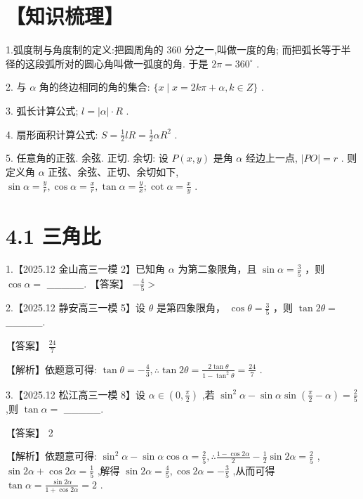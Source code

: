 \documentclass[10pt]{article}
\begin{document}
\section*{【知识梳理】}

1.弧度制与角度制的定义:把圆周角的 360 分之一,叫做一度的角; 而把弧长等于半径的这段弧所对的圆心角叫做一弧度的角. 于是 \({2\pi } = {360}^{ \circ  }\) .

2. 与 \(\alpha\) 角的终边相同的角的集合: \(\{ x \mid  x = {2k\pi } + \alpha ,k \in  Z\}\) .

3. 弧长计算公式; \(l = \left| \alpha \right|  \cdot  R\) .

4. 扇形面积计算公式: \(S = \frac{1}{2}{lR} = \frac{1}{2}\alpha {R}^{2}\) .

5. 任意角的正弦. 余弦. 正切. 余切: 设 \(P\left( {x,y}\right)\) 是角 \(\alpha\) 经边上一点, \(\left| {PO}\right|  = r\) . 则定义角 \(\alpha\) 正弦、余弦、正切、余切如下, \(\sin \alpha  = \frac{y}{r},\cos \alpha  = \frac{x}{r},\tan \alpha  = \frac{y}{x};\cot \alpha  = \frac{x}{y}\) .

\section*{4.1 三角比}

1.【2025.12 金山高三一模 2】已知角 \(\alpha\) 为第二象限角，且 \(\sin \alpha  = \frac{3}{5}\) ，则 \(\cos \alpha  =\) \_\_\_\_\_. 【答案】 \(- \frac{4}{5} >\)

2.【2025.12 静安高三一模 5】设 \(\theta\) 是第四象限角， \(\cos \theta  = \frac{3}{5}\) ，则 \(\tan {2\theta } =\) \_\_\_\_\_.

【答案】 \(\frac{24}{7}\)

【解析】依题意可得: \(\tan \theta  =  - \frac{4}{3},\therefore \tan {2\theta } = \frac{2\tan \theta }{1 - {\tan }^{2}\theta } = \frac{24}{7}\) .

3.【2025.12 松江高三一模 8】设 \(\alpha  \in  \left( {0,\frac{\pi }{2}}\right)\) ,若 \({\sin }^{2}\alpha  - \sin \alpha \sin \left( {\frac{\pi }{2} - \alpha }\right)  = \frac{2}{5}\) ,则 \(\tan \alpha  =\) \_\_\_\_\_.

【答案】 2

【解析】依题意可得: \({\sin }^{2}\alpha  - \sin \alpha \cos \alpha  = \frac{2}{5},\therefore \frac{1 - \cos {2\alpha }}{2} - \frac{1}{2}\sin {2\alpha } = \frac{2}{5}\) , \(\sin {2\alpha } + \cos {2\alpha } = \frac{1}{5}\) ,解得 \(\sin {2\alpha } = \frac{4}{5},\cos {2\alpha } =  - \frac{3}{5}\) ,从而可得 \(\tan \alpha  = \frac{\sin {2\alpha }}{1 + \cos {2\alpha }} = 2\) .
\end{document}
